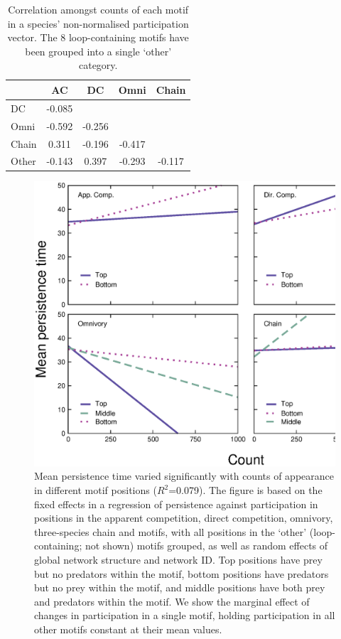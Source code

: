 \documentclass[12pt]{article}
\begin{document}
		\begin{table}[hb!]
    		\caption{Correlation amongst counts of each motif in a species' non-normalised participation vector. The 8 loop-containing motifs have been grouped into a single `other' category.}
    		\label{tab:count_correlations}
    		\begin{tabular}{l | c c c c}
    			& AC & DC & Omni & Chain \\
    		\hline
    		DC    & -0.085 &        &        &        \\   
    		Omni  & -0.592 & -0.256 &        &        \\
    		Chain &  0.311 & -0.196 & -0.417 &        \\
    		Other & -0.143 &  0.397 & -0.293 & -0.117 \\
    		\hline
    		\end{tabular}
    		\end{table}

        \begin{figure}[ht!]
            \centering
            \includegraphics[width=\textwidth]{figures/roles/persistence_vs_positions_count.eps}
            \caption{Mean persistence time varied significantly with counts of appearance in different motif positions ($R^2$=0.079). The figure is based on the fixed effects in a regression of persistence against participation in positions in the apparent competition, direct competition, omnivory, three-species chain and motifs, with all positions in the `other' (loop-containing; not shown) motifs grouped, as well as random effects of global network structure and network ID. Top positions have prey but no predators within the motif, bottom positions have predators but no prey within the motif, and middle positions have both prey and predators within the motif. We show the marginal effect of changes in participation in a single motif, holding participation in all other motifs constant at their mean values.}
            \label{fig:persistence_positions_count}
        \end{figure}
\end{document}
